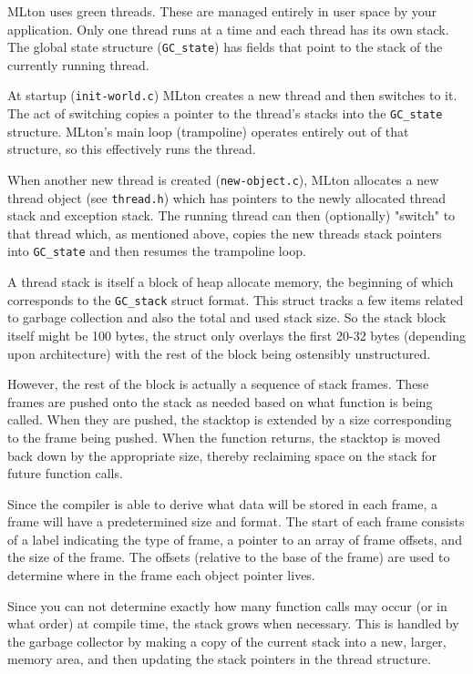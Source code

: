 MLton uses green threads. These are managed entirely in user space by your application. Only one thread runs at a time and each thread has its own stack. The global state structure (\texttt{GC\_state}) has fields that point to the stack of the currently running thread.

At startup (\texttt{init-world.c}) MLton creates a new thread and then switches to it. The act of switching copies a pointer to the thread's stacks into the \texttt{GC\_state} structure. MLton's main loop (trampoline) operates entirely out of that structure, so this effectively runs the thread.

When another new thread is created (\texttt{new-object.c}), MLton allocates a new thread object (see \texttt{thread.h}) which has pointers to the newly allocated thread stack and exception stack. The running thread can then (optionally) "switch" to that thread which, as mentioned above, copies the new threads stack pointers into \texttt{GC\_state} and then resumes the trampoline loop.

A thread stack is itself a block of heap allocate memory, the beginning of which corresponds to the \texttt{GC\_stack} struct format. This struct tracks a few items related to garbage collection and also the total and used stack size. So the stack block itself might be 100 bytes, the struct only overlays the first 20-32 bytes (depending upon architecture) with the rest of the block being ostensibly unstructured. 

However, the rest of the block is actually a sequence of stack frames. These frames are pushed onto the stack as needed based on what function is being called. When they are pushed, the stacktop is extended by a size corresponding to the frame being pushed. When the function returns, the stacktop is moved back down by the appropriate size, thereby reclaiming space on the stack for future function calls. 

Since the compiler is able to derive what data will be stored in each frame, a frame will have a predetermined size and format. The start of each frame consists of a label indicating the type of frame, a pointer to an array of frame offsets, and the size of the frame. The offsets (relative to the base of the frame) are used to determine where in the frame each object pointer lives. 

Since you can not determine exactly how many function calls may occur (or in what order) at compile time, the stack grows when necessary. This is handled by the garbage collector by making a copy of the current stack into a new, larger, memory area, and then updating the stack pointers in the thread structure. 

